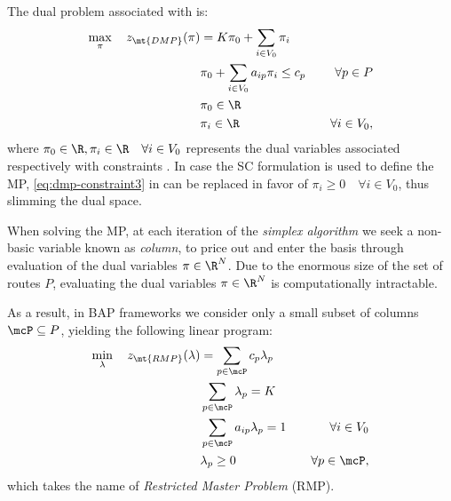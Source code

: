 The dual problem associated with
is:
\begin{align}
	\max_{\pi} \quad z_\mt{DMP}(\pi) & =  K \pi_0 + \sum_{i \in V_0} \pi_i           & \label{eq:dmp-obj-func}                             \\
	                                 & \pi_0 + \sum_{i \in V_0} a_{ip} \pi_i \le c_p & \quad \forall p \in P \label{eq:dmp-constraint1}    \\
	                                 & \pi_0 \in \R                                  & \label{eq:dmp-constraint2}                          \\
	                                 & \pi_i \in \R                                  & \quad \forall i \in V_0 \label{eq:dmp-constraint3},
\end{align}
where $\pi_0 \in \R, \pi_i \in \R \quad \forall i \in V_0$ represents the dual variables
associated respectively with constraints .
In case the SC formulation
is used to define the MP,
\cref{eq:dmp-constraint3} in
can be replaced in favor of $\pi_i \ge 0 \quad \forall i \in V_0$,
thus slimming the dual space.

When solving the MP,
at each iteration of the \textit{simplex algorithm} \parencite{dantzig1955}
we seek a non-basic variable known as \textit{column},
to price out and enter the basis through evaluation of the dual variables $\pi \in \R^N$.
Due to the enormous size of the set of routes $P$,
evaluating the dual variables $\pi \in \R^{N}$ is computationally intractable.

\medskip

As a result, in BAP frameworks we consider only a small subset of columns $\mcP \subseteq P$,
yielding the following linear program:
\begin{align}
	\min_{\lambda} \quad z_\mt{RMP}(\lambda) & = \sum_{p \in \mcP}  c_p \lambda_p      & \label{eq:rmp-obj-func}                                                                                                    \\
	                                         & \sum_{p \in \mcP} \lambda_{p} = K       & \label{eq:rmp-K-routes}                                                                                                    \\
	                                         & \sum_{p \in \mcP}  a_{ip} \lambda_p = 1 & \quad \forall i \in V_0                                              \label{eq:rmp-customers-visited-by-exactly-one-route} \\
	                                         & \lambda_p \ge 0                         & \quad \forall p \in \mcP \label{eq:rmp-lambda-mip-var-bounds},
\end{align}
which takes the name of \textit{Restricted Master Problem} (RMP).

